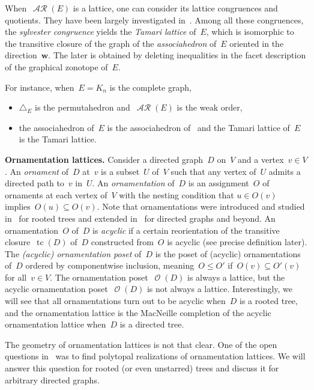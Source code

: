\documentclass{amsart}
\theoremstyle{definition}
\renewcommand{\b}[1]{\boldsymbol{#1}} %
\renewcommand{\c}[1]{\mathcal{#1}} %
\newcommand{\simplex}{\triangle} %
\DeclareMathOperator{\tc}{tc} %
\newcommand{\para}[1]{\bigskip\noindent\textbf{#1}} %
\newcommand{\darkblue}{\color{darkblue}} %
\newcommand{\defn}[1]{\textsl{\darkblue #1}} %
\DeclareMathOperator{\Orn}{\c{O}}  %
\DeclareMathOperator{\AReori}{\c{AR}}  %
\begin{document}
When~$\AReori(E)$ is a lattice, one can consider its lattice congruences and quotients.
They have been largely investigated in~\cite{Pilaud-acyclicReorientationLattices}.
Among all these congruences, the \defn{sylvester congruence} yields the \defn{Tamari lattice} of~$E$, which is isomorphic to the transitive closure of the graph of the \defn{associahedron} of~$E$ oriented in the direction~$\b{w}$.
The later is obtained by deleting inequalities in the facet description of the graphical zonotope of~$E$.

For instance, when~$E = K_n$ is the complete graph,
\begin{itemize}
\item $\simplex_E$ is the permutahedron and~$\AReori(E)$ is the weak order,
\item the associahedron of~$E$ is the associahedron of~\cite{ShniderSternberg,Loday} and the Tamari lattice of~$E$ is the Tamari lattice.
\end{itemize}


\para{Ornamentation lattices.}
Consider a directed graph~$D$ on~$V$ and a vertex~$v \in V$.
An \defn{ornament} of~$D$ at~$v$ is a subset~$U$ of~$V$ such that any vertex of~$U$ admits a directed path to~$v$ in~$U$.
An \defn{ornamentation} of~$D$ is an assignment~$O$ of ornaments at each vertex of~$V$ with the nesting condition that $u \in O(v)$ implies~$O(u) \subseteq O(v)$.
Note that ornamentations were introduced and studied in~\cite{DefantSack} for rooted trees and extended in~\cite{Sack} for directed graphs and beyond.
An ornamentation~$O$ of~$D$ is \defn{acyclic} if a certain reorientation of the transitive closure~$\tc(D)$ of~$D$ constructed from~$O$ is acyclic (see precise definition later).
The \defn{(acyclic) ornamentation poset} of~$D$ is the poset of (acyclic) ornamentations of~$D$ ordered by componentwise inclusion, meaning~$O \le O'$ if~${O(v) \subseteq O'(v)}$ for all~$v \in V$.
The ornamentation poset~$\Orn(D)$ is always a lattice, but the acyclic ornamentation poset~$\Orn(D)$ is not always a lattice.
Interestingly, we will see that all ornamentations turn out to be acyclic when~$D$ is a rooted tree, and the ornamentation lattice is the MacNeille completion of the acyclic ornamentation lattice when~$D$ is a directed tree.

The geometry of ornamentation lattices is not that clear.
One of the open questions in~\cite{DefantSack} was to find polytopal realizations of ornamentation lattices.
We will answer this question for rooted (or even unstarred) trees and discuss it for arbitrary directed graphs.
\end{document}
